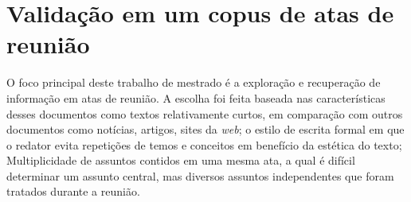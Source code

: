 \section{Validação em um copus de atas de reunião}	
\label{sec:aplicacao-sistema}

O foco principal deste trabalho de mestrado é a exploração e recuperação de informação em atas de reunião. A escolha foi feita baseada nas características desses documentos como textos relativamente curtos, em comparação com outros documentos como notícias, artigos, sites da \textit{web}; o estilo de escrita formal em que o redator evita repetições de temos e conceitos em benefício da estética do texto; Multiplicidade de assuntos contidos em uma mesma ata, a qual é difícil determinar um assunto central, mas diversos assuntos independentes que foram tratados durante a reunião.





